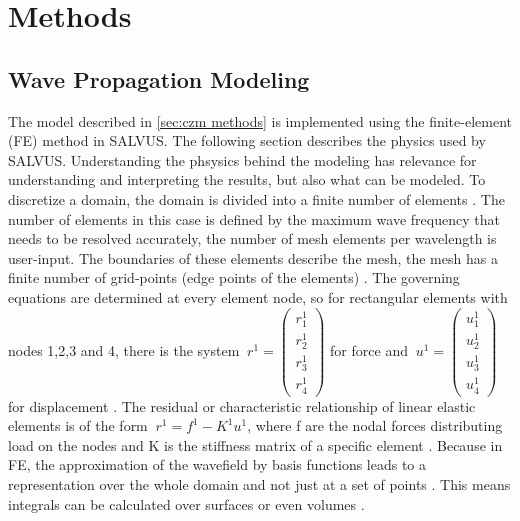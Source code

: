 \documentclass[10pt]{article}
\begin{document}

\section{Methods}

\subsection{Wave Propagation Modeling}
\label{sec:salvus method}
The model described in \ref{sec:czm methods} is implemented using the finite-element (FE) method in SALVUS. The following section describes the physics used by SALVUS. Understanding the phsysics behind the modeling has relevance for understanding and interpreting the results, but also what can be modeled. To discretize a domain, the domain is divided into a finite number of elements \parencite{FiniteElementMethod}. The number of elements in this case is defined by the maximum wave frequency that needs to be resolved accurately, the number of mesh elements per wavelength is user-input. The boundaries of these elements describe the mesh, the mesh has a finite number of grid-points (edge points of the elements) \parencite{FiniteElementMethod}. The governing equations are determined at every element node, so for rectangular elements with nodes 1,2,3 and 4, there is the system $\ r^1 = \begin{pmatrix}r_1^1 \\ r_2^1 \\ r_3^1\\ r_4^1 \end{pmatrix}$ for force  and $\ u^1 = \begin{pmatrix}u_1^1 \\ u_2^1 \\ u_3^1\\ u_4^1 \end{pmatrix}$ for displacement \parencite{FiniteElementMethod}. The residual or characteristic relationship of linear elastic elements is of the form $\ r^1 = f^1-K^1u^1 $, where f are the nodal forces distributing load on the nodes and K is the stiffness matrix of a specific element \parencite{FiniteElementMethod}. Because in FE, the approximation of the wavefield by basis functions leads to a representation over the whole domain and not just at a set of points \parencite{afanasievModularFlexibleSpectralelement2019}. This means integrals can be calculated over surfaces or even volumes \parencite{afanasievModularFlexibleSpectralelement2019}. \par
\end{document}
